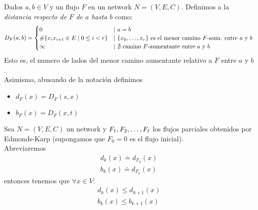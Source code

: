 \begin{definition}
  Dados $a,b\in V$ y un flujo $F$ en un network $N = (V,E,C)$. Definimos a la 
  \emph{distancia respecto de $F$ de $a$ hasta $b$} como:
  \begin{align}
    D_F(a,b) = 
    \begin{cases}
      0 & |\ a = b\\
      \#\{x_i x_{i+1} \in E\mid 0\le i < r \}  & |\ \{x_0, \mathellipsis, x_r\} \text{ es el menor camino $F$-aum. entre $a$ y $b$} \\ 
      \infty & |\ \nexists~ \text{camino $F$-aumentante entre $a$ y $b$}
    \end{cases}
  \end{align}
  Esto es, el numero de lados del menor camino aumentante relativo a $F$ entre $a$ y $b$.\\
  Asimismo, abusando de la notación definimos
  \begin{itemize}
  \item $d_F(x) = D_F(s,x)$
  \item $b_F(x) = D_F(x,t)$
  \end{itemize}
\end{definition}

\begin{lemma}\label{distancias_no_decrecen_EK}
  Sea $N=(V,E,C)$ un network y $F_1, F_2, \mathellipsis, F_\ell$ los flujos 
  parciales obtenidos por Edmonds-Karp (supongamos que $F_0 = 0$ es el flujo inicial).\\
  Abreviaremos
  \begin{align}
    d_k(x) \doteq d_{F_k}(x) \\
    b_k(x) \doteq d_{F_k}(x)
  \end{align} entonces tenemos que $\forall x \in V$:
  \begin{align}
    d_k(x) \le d_{k+1}(x) \\
    b_k(x) \le b_{k+1}(x)
  \end{align}
\end{lemma}

